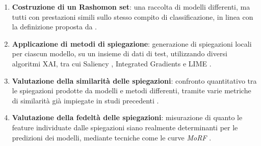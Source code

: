 \documentclass{article}
\begin{document}
\begin{enumerate}
      \item \textbf{Costruzione di un Rashomon set}: una raccolta di modelli differenti,
            ma tutti con prestazioni simili sullo stesso compito di classificazione,
            in linea con la definizione proposta da \citet{fisher2019all}.
      \item \textbf{Applicazione di metodi di spiegazione}: generazione di spiegazioni locali
            per ciascun modello, su un insieme di dati di test, utilizzando diversi algoritmi XAI,
            tra cui Saliency \citep{simonyan2013deep}, Integrated Gradients \citep{sundararajan2017axiomatic}
            e LIME \citep{ribeiro2016lime}.
      \item \textbf{Valutazione della similarità delle spiegazioni}: confronto quantitativo
            tra le spiegazioni prodotte da modelli e metodi differenti, tramite varie metriche di similarità
            già impiegate in studi precedenti \citep{samek2016evaluating,adebayo2018sanity}.
      \item \textbf{Valutazione della fedeltà delle spiegazioni}: misurazione di quanto le
            feature individuate dalle spiegazioni siano realmente determinanti per le predizioni dei modelli,
            mediante tecniche come le curve \emph{MoRF} \citep{samek2016evaluating}.
\end{enumerate}
\end{document}

